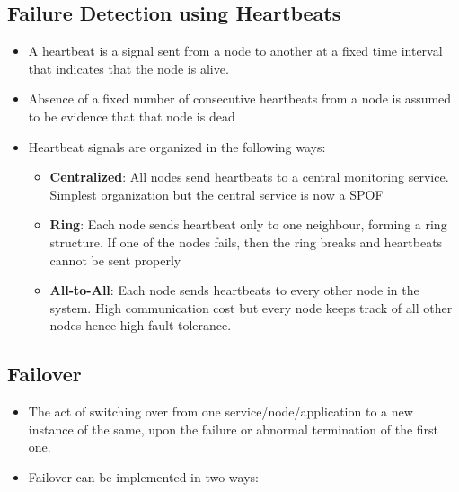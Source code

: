 \documentclass{article}
\begin{document}
\subsection{Failure Detection using Heartbeats}
\begin{itemize}
    \item A heartbeat is a signal sent from a node to another at a fixed time interval that indicates that the node is alive. 
    
    \item Absence of a fixed number of consecutive heartbeats from a node is assumed to be evidence that that node is dead
    
    \item Heartbeat signals are organized in the following ways:
    \begin{itemize}
        \item \textbf{Centralized}: All nodes send heartbeats to a central monitoring service. Simplest organization but the central service is now a SPOF
        
        \item \textbf{Ring}: Each node sends heartbeat only to one neighbour, forming a ring structure. If one of the nodes fails, then the ring breaks and heartbeats cannot be sent properly
        
        \item \textbf{All-to-All}: Each node sends heartbeats to every other node in the system. High communication cost but every node keeps track of all other nodes hence high fault tolerance.  
    \end{itemize}
\end{itemize}

\subsection{Failover}
\begin{itemize}
    \item The act of switching over from one service/node/application to a new instance of the same, upon the failure or abnormal termination of the first one. 
    
    \item Failover can be implemented in two ways:
\end{itemize}
\end{document}
